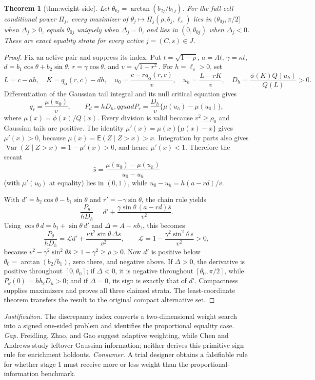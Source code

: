 \documentclass{article}
\newtheorem{theorem}{Theorem}
\begin{document}
\begin{theorem}[thm:weight-side]\label{thm:weight-side}
Let \(\theta_{0j}=\arctan(b_{2j}/b_{1j})\). For the full-cell conditional power \(\Pi_j\), every maximizer of \(\theta_j\mapsto\Pi_j(\rho,\theta_j,\ell_s)\) lies in \( (\theta_{0j},\pi/2]\) when \(\Delta_j>0\), equals \(\theta_{0j}\) uniquely when \(\Delta_j=0\), and lies in \( (0,\theta_{0j})\) when \(\Delta_j<0\). These are exact equality strata for every active \(j=(C,s)\in J\).
\end{theorem}
\begin{proof}
Fix an active pair and suppress its index.  Put \(t=\sqrt{1-\rho}\), \(a=At\), \(\gamma=\kappa t\), \(d=b_1\cos\theta+b_2\sin\theta\), \(r=\gamma\cos\theta\), and \(v=\sqrt{1-r^2}\).  For \(h=\ell_s>0\), set
\[
L=c-ah,\quad K=q_\alpha(r,c)-dh,\quad
u_0=\frac{c-rq_\alpha(r,c)}v,\quad
u_h=\frac{L-rK}v,
\quad D_h=\frac{\phi(K)Q(u_h)}{Q(L)}>0.
\]
Differentiation of the Gaussian tail integral and its null critical equation gives
\[
q_r=\frac{\mu(u_0)}v,\qquad P_d=hD_h,qquad
P_r=\frac{D_h}{v}\{\mu(u_h)-\mu(u_0)\},
\]
where \(\mu(x)=\phi(x)/Q(x)\).  Every division is valid because \(v^2\ge\rho_0\) and Gaussian tails are positive.  The identity \(\mu'(x)=\mu(x)\{\mu(x)-x\}\) gives \(\mu'(x)>0\), because \(\mu(x)=\mathsf E(Z\mid Z>x)>x\).  Integration by parts also gives \(\operatorname{Var}(Z\mid Z>x)=1-\mu'(x)>0\), and hence \(\mu'(x)<1\).  Therefore the secant
\[
\bar s=\frac{\mu(u_0)-\mu(u_h)}{u_0-u_h}
\]
(with \(\mu'(u_0)\) at equality) lies in \((0,1)\), while \(u_0-u_h=h(a-rd)/v\).

With \(d'=b_2\cos\theta-b_1\sin\theta\) and \(r'=-\gamma\sin\theta\), the chain rule yields
\[
\frac{P_\theta}{hD_h}
=d'+\frac{\gamma\sin\theta\,(a-rd)\bar s}{v^2}.
\]
Using \(\cos\theta\,d=b_1+\sin\theta\,d'\) and \(\Delta=A-\kappa b_1\), this becomes
\[
\frac{P_\theta}{hD_h}
=\mathcal Ld'+\frac{\kappa t^2\sin\theta\,\Delta\bar s}{v^2},
\qquad
\mathcal L=1-\frac{\gamma^2\sin^2\theta\,\bar s}{v^2}>0,
\]
because \(v^2-\gamma^2\sin^2\theta\bar s\ge1-\gamma^2\ge\rho>0\).  Now \(d'\) is positive below \(\theta_0=\arctan(b_2/b_1)\), zero there, and negative above.  If \(\Delta>0\), the derivative is positive throughout \([0,\theta_0]\); if \(\Delta<0\), it is negative throughout \([\theta_0,\pi/2]\), while \(P_\theta(0)=hb_2D_h>0\); and if \(\Delta=0\), its sign is exactly that of \(d'\).  Compactness supplies maximizers and proves all three claimed strata.  The least-coordinate theorem transfers the result to the original compact alternative set.
\end{proof}
\par\smallskip\noindent \textit{Justification.} The discrepancy index converts a two-dimensional weight search into a signed one-sided problem and identifies the proportional equality case. \textit{Gap.} Freidling, Zhao, and Gao suggest adaptive weighting, while Chen and Andrews study leftover Gaussian information; neither derives this primitive sign rule for enrichment holdouts. \textit{Consumer.} A trial designer obtains a falsifiable rule for whether stage 1 must receive more or less weight than the proportional-information benchmark.
\end{document}
